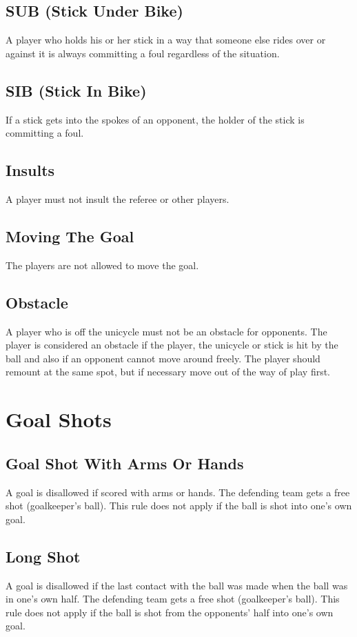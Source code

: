 \subsection{SUB (Stick Under Bike) \label{subsec:hockey_fouls_sub}}
A player who holds his or her stick in a way that someone else rides over or against it is always committing a foul regardless of the situation.

\subsection{SIB (Stick In Bike)}
If a stick gets into the spokes of an opponent, the holder of the stick is committing a foul.

\subsection{Insults}
A player must not insult the referee or other players.

\subsection{Moving The Goal}
The players are not allowed to move the goal.

\subsection{Obstacle}
A player who is off the unicycle must not be an obstacle for opponents.
The player is considered an obstacle if the player, the unicycle or stick is hit by the ball and also if an opponent cannot move around freely.
The player should remount at the same spot, but if necessary move out of the way of play first.

\section{Goal Shots}

\subsection{Goal Shot With Arms Or Hands \label{subsec:hockey_goal-shots_with-arms-or-hands}}
A goal is disallowed if scored with arms or hands.
The defending team gets a free shot (goalkeeper's ball).
This rule does not apply if the ball is shot into one's own goal.

\subsection{Long Shot}
A goal is disallowed if the last contact with the ball was made when the ball was in one's own half.
The defending team gets a free shot (goalkeeper's ball).
This rule does not apply if the ball is shot from the opponents' half into one's
own goal.

